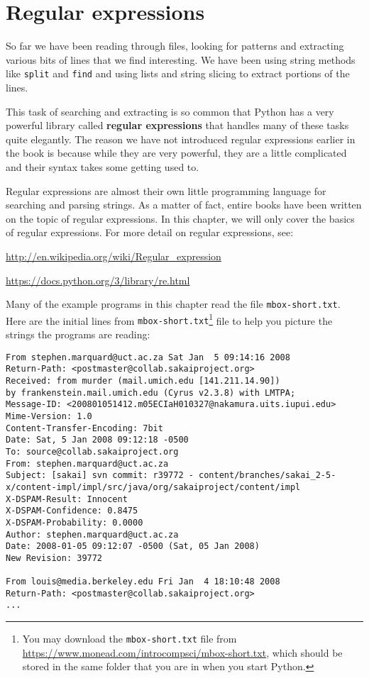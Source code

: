 
\chapter{Regular expressions}

So far we have been reading through files, looking for patterns and extracting various
bits of lines that we find interesting.  We have been using string methods like {\tt split}
and {\tt find} and using lists and string slicing to extract portions of the lines.

This task of searching and extracting is so common that Python has a very powerful library
called {\bf regular expressions} that handles many of these tasks quite elegantly.  The
reason we have not introduced regular expressions earlier in the book is because while they
are very powerful, they are a little complicated and their syntax takes some getting used to. 

Regular expressions are almost their own little programming language for searching and parsing
strings.  As a matter of fact, entire books have been written on the topic of regular expressions.
In this chapter, we will only cover the basics of regular expressions.  For more detail on regular
expressions, see:

\url{http://en.wikipedia.org/wiki/Regular_expression}

\url{https://docs.python.org/3/library/re.html}

Many of the example programs in this chapter read the file {\tt mbox-short.txt}. Here are the initial lines from {\tt mbox-short.txt}\footnote{You may download the \texttt{mbox-short.txt} file from \url{https://www.monead.com/introcompsci/mbox-short.txt}, which should be stored in the same folder that you are in when you start Python.} file to help you picture the strings the programs are reading:

\beforeverb
\begin{verbatim}
From stephen.marquard@uct.ac.za Sat Jan  5 09:14:16 2008
Return-Path: <postmaster@collab.sakaiproject.org>
Received: from murder (mail.umich.edu [141.211.14.90])
by frankenstein.mail.umich.edu (Cyrus v2.3.8) with LMTPA;
Message-ID: <200801051412.m05ECIaH010327@nakamura.uits.iupui.edu>
Mime-Version: 1.0
Content-Transfer-Encoding: 7bit
Date: Sat, 5 Jan 2008 09:12:18 -0500
To: source@collab.sakaiproject.org
From: stephen.marquard@uct.ac.za
Subject: [sakai] svn commit: r39772 - content/branches/sakai_2-5-x/content-impl/impl/src/java/org/sakaiproject/content/impl
X-DSPAM-Result: Innocent
X-DSPAM-Confidence: 0.8475
X-DSPAM-Probability: 0.0000
Author: stephen.marquard@uct.ac.za
Date: 2008-01-05 09:12:07 -0500 (Sat, 05 Jan 2008)
New Revision: 39772

From louis@media.berkeley.edu Fri Jan  4 18:10:48 2008
Return-Path: <postmaster@collab.sakaiproject.org>
...
\end{verbatim}
\afterverb


